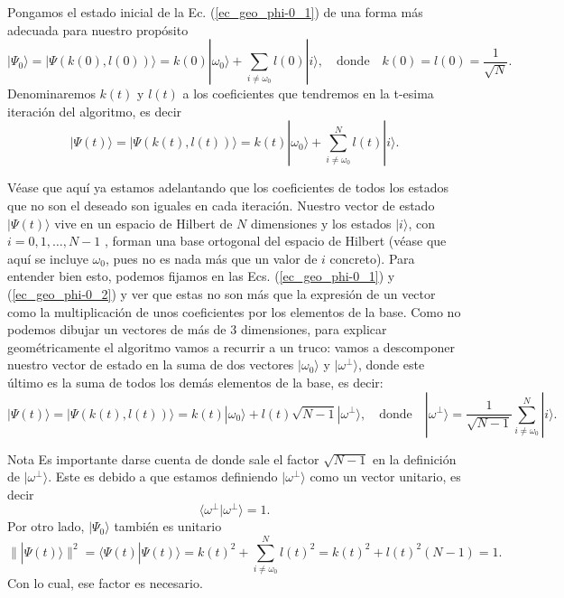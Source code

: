 \documentclass[a4paper,11pt]{book} %
\numberwithin{equation}{chapter}
\begin{document}
Pongamos el estado inicial de la Ec. (\ref{ec_geo_phi-0_1}) de una forma más adecuada para nuestro propósito
\begin{equation} \label{ec_geo_phi-0_2}
\boxed{|\Psi_0 \rangle = | \Psi (k(0),l(0)) \rangle = k(0) |\omega_0 \rangle + \sum_{i \neq \omega_0}  l(0)  |i \rangle}, \quad \text{donde} \quad \boxed{k(0) = l(0) = \frac{1}{\sqrt{N}}}.
\end{equation}
Denominaremos $k(t)$ y $l(t)$ a los coeficientes que tendremos en la t-esima iteración del algoritmo, es decir
\begin{equation} \label{ec_geo_phi-j}
\boxed{|\Psi(t) \rangle = | \Psi (k(t),l(t)) \rangle = k(t) |\omega_0 \rangle +  \sum_{i \neq \omega_0}^N l(t) |i \rangle }.
\end{equation}

Véase que aquí ya estamos adelantando que los coeficientes de todos los estados que no son el deseado son iguales en cada iteración. Nuestro vector de estado $|\Psi(t) \rangle$ vive en un espacio de Hilbert de $N$ dimensiones y los estados $| i \rangle$, con $i=0,1,\dots,N-1$ , forman una base ortogonal del espacio de Hilbert (véase que aquí se incluye $\omega_0$, pues no es nada más que un valor de $i$ concreto). Para entender bien esto, podemos fijamos en las Ecs. (\ref{ec_geo_phi-0_1}) y (\ref{ec_geo_phi-0_2}) y ver que estas no son más que la expresión de un vector como la multiplicación de unos coeficientes por los elementos de la base. Como no podemos dibujar un vectores de más de 3 dimensiones, para explicar geométricamente el algoritmo vamos a recurrir a un truco: vamos a descomponer nuestro vector de estado en la suma de dos vectores $|\omega_0 \rangle$ y $| \omega^{\perp} \rangle$, donde este último es la suma de todos los demás elementos de la base, es decir:
\begin{equation} \label{ec_geo_phi-j-s}
\boxed{|\Psi(t) \rangle = | \Psi (k(t),l(t)) \rangle = k(t) |\omega_0 \rangle + l(t) \sqrt{N-1} | \omega^{\perp}  \rangle}, \quad \text{donde} \quad \boxed{| \omega^{\perp}  \rangle = \frac{1}{\sqrt{N-1}}\sum_{i \neq \omega_0}^N  |i \rangle}.
\end{equation}

	\begin{mybox_blue}{Nota}
	Es importante darse cuenta de donde sale el factor $\sqrt{N-1}$ en la definición de 
	$|\omega^{\perp}\rangle$. Este es debido a que estamos definiendo $|\omega^{\perp}\rangle$ 
	como un vector unitario, es decir 
	\begin{equation}
	\langle \omega^{\perp}| \omega^{\perp} \rangle = 1.
	\end{equation}
	Por otro lado, $|\Psi_0\rangle$ también es unitario
	\begin{equation}
	\parallel |\Psi(t) \rangle \parallel^2 = \langle \Psi(t) | \Psi(t) \rangle = 
	k(t)^2 + \sum_{i \neq \omega_0}^N l(t)^2 = k(t)^2 + l(t)^2 (N-1) = 1 .
	\end{equation}
	Con lo cual, ese factor es necesario.
	\end{mybox_blue}
\end{document}
